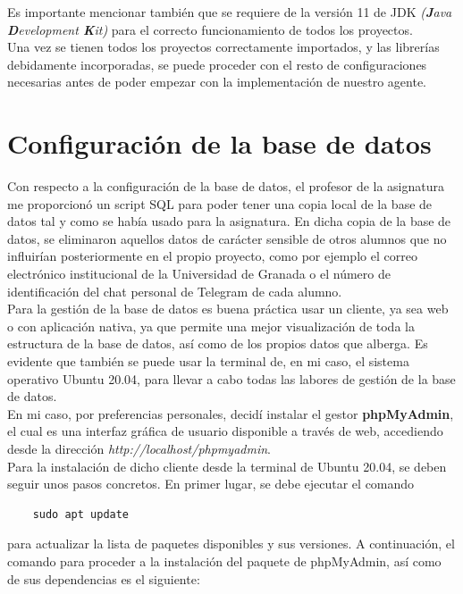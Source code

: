 Es importante mencionar también que se requiere de la versión 11 de JDK \textit{(\textbf{J}ava \textbf{D}evelopment \textbf{K}it)} para el correcto funcionamiento de todos los proyectos.\\

Una vez se tienen todos los proyectos correctamente importados, y las librerías debidamente incorporadas, se puede proceder con el resto de configuraciones necesarias antes de poder empezar con la implementación de nuestro agente.

\section{Configuración de la base de datos}

Con respecto a la configuración de la base de datos, el profesor de la asignatura me proporcionó un script SQL para poder tener una copia local de la base de datos tal y como se había usado para la asignatura. En dicha copia de la base de datos, se eliminaron aquellos datos de carácter sensible de otros alumnos que no influirían posteriormente en el propio proyecto, como por ejemplo el correo electrónico institucional de la Universidad de Granada o el número de identificación del chat personal de Telegram de cada alumno.\\

Para la gestión de la base de datos es buena práctica usar un cliente, ya sea web o con aplicación nativa, ya que permite una mejor visualización de toda la estructura de la base de datos, así como de los propios datos que alberga. Es evidente que también se puede usar la terminal de, en mi caso, el sistema operativo Ubuntu 20.04, para llevar a cabo todas las labores de gestión de la base de datos.\\

En mi caso, por preferencias personales, decidí instalar el gestor \textbf{phpMyAdmin}, el cual es una interfaz gráfica de usuario disponible a través de web, accediendo desde la dirección \textit{http://localhost/phpmyadmin}.\\

Para la instalación de dicho cliente desde la terminal de Ubuntu 20.04, se deben seguir unos pasos concretos. En primer lugar, se debe ejecutar el comando

\begin{lstlisting}
    sudo apt update
\end{lstlisting}

para actualizar la lista de paquetes disponibles y sus versiones. A continuación, el comando para proceder a la instalación del paquete de phpMyAdmin, así como de sus dependencias es el siguiente:

